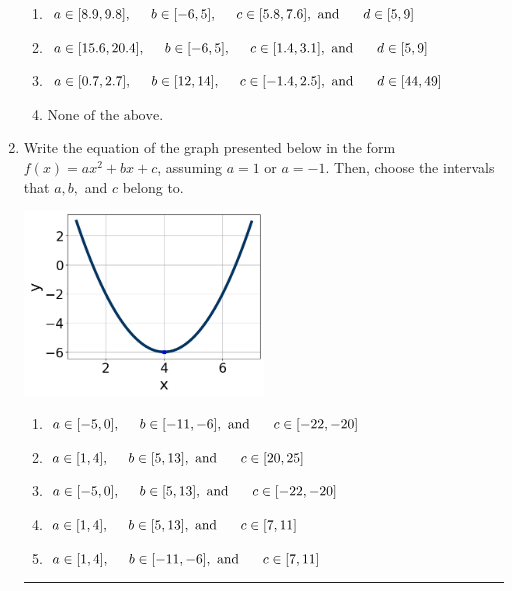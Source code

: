 \documentclass[14pt]{extbook}
\newcommand{\litem}[1]{\item#1\hspace*{-1cm}\rule{\textwidth}{0.4pt}}
\begin{document}
\begin{enumerate}
{\begin{enumerate}[label=\Alph*.]
\item \( a \in [8.9, 9.8], \hspace*{5mm} b \in [-6, 5], \hspace*{5mm} c \in [5.8, 7.6], \text{ and } \hspace*{5mm} d \in [5, 9] \)
\item \( a \in [15.6, 20.4], \hspace*{5mm} b \in [-6, 5], \hspace*{5mm} c \in [1.4, 3.1], \text{ and } \hspace*{5mm} d \in [5, 9] \)
\item \( a \in [0.7, 2.7], \hspace*{5mm} b \in [12, 14], \hspace*{5mm} c \in [-1.4, 2.5], \text{ and } \hspace*{5mm} d \in [44, 49] \)
\item \( \text{None of the above.} \)

\end{enumerate} }
\litem{
Write the equation of the graph presented below in the form $f(x)=ax^2+bx+c$, assuming  $a=1$ or $a=-1$. Then, choose the intervals that $a, b,$ and $c$ belong to.
\begin{center}
    \includegraphics[width=0.5\textwidth]{../Figures/quadraticGraphToEquationCopyA.png}
\end{center}
\begin{enumerate}[label=\Alph*.]
\item \( a \in [-5, 0], \hspace*{5mm} b \in [-11, -6], \text{ and } \hspace*{5mm} c \in [-22, -20] \)
\item \( a \in [1, 4], \hspace*{5mm} b \in [5, 13], \text{ and } \hspace*{5mm} c \in [20, 25] \)
\item \( a \in [-5, 0], \hspace*{5mm} b \in [5, 13], \text{ and } \hspace*{5mm} c \in [-22, -20] \)
\item \( a \in [1, 4], \hspace*{5mm} b \in [5, 13], \text{ and } \hspace*{5mm} c \in [7, 11] \)
\item \( a \in [1, 4], \hspace*{5mm} b \in [-11, -6], \text{ and } \hspace*{5mm} c \in [7, 11] \)


\end{enumerate}}
\end{enumerate}
\end{document}
